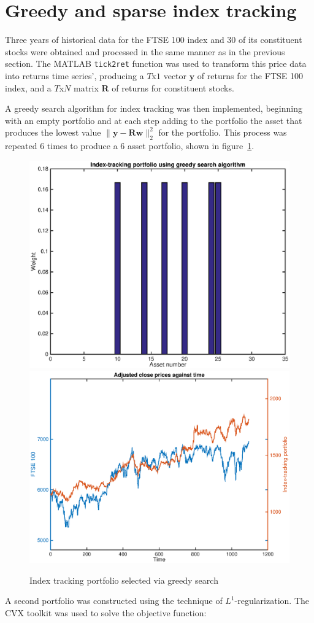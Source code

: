 \documentclass[a4paper, 12pt]{article}
\begin{document}
	\section{Greedy and sparse index tracking}

	Three years of historical data for the FTSE 100 index and 30 of its constituent stocks were obtained and processed in the same manner as in the previous section. The MATLAB \texttt{tick2ret} function was used to transform this price data into returns time series', producing a $T$x$1$ vector $\mathbf{y}$ of returns for the FTSE 100 index, and a $T$x$N$ matrix $\mathbf{R}$ of returns for constituent stocks.

	A greedy search algorithm for index tracking was then implemented, beginning with an empty portfolio and at each step adding to the portfolio the asset that produces the lowest value $\|\mathbf{y} - \mathbf{Rw}\|_2^2$ for the portfolio. This process was repeated 6 times to produce a 6 asset portfolio, shown in figure~\ref{fig:p3a}.

	\begin{figure}[b!]
		\begin{center}
			\includegraphics[width=0.45\linewidth]{figures/p3a_portfolio.eps}
			\includegraphics[width=0.45\linewidth]{figures/p3a_ticker.eps}
		\end{center}
		\caption{Index tracking portfolio selected via greedy search}
		\label{fig:p3a}
	\end{figure}

	A second portfolio was constructed using the technique of $L^1$-regularization. The CVX toolkit was used to solve the objective function:
\end{document}
